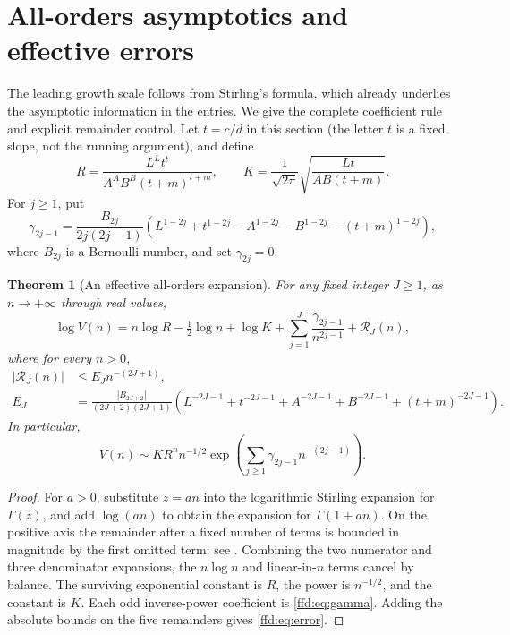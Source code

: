 \documentclass[11pt]{article}
\newtheorem{theorem}{Theorem}[section]
\theoremstyle{definition}
\theoremstyle{remark}
\begin{document}
\section{All-orders asymptotics and effective errors}\label{ffd:sec:asymptotic}
The leading growth scale follows from Stirling's formula, which already
underlies the asymptotic information in the entries. We give the complete
coefficient rule and explicit remainder control. Let $t=c/d$ in this section
(the letter $t$ is a fixed slope, not the running argument), and define
\begin{equation}
 R=\frac{L^L t^t}{A^A B^B(t+m)^{t+m}},\qquad
 K=\frac1{\sqrt{2\pi}}\sqrt{\frac{Lt}{AB(t+m)}}.
 \label{ffd:eq:RK}
\end{equation}
For $j\ge1$, put
\begin{equation}
 \gamma_{2j-1}=
 \frac{B_{2j}}{2j(2j-1)}
 \left(L^{1-2j}+t^{1-2j}-A^{1-2j}-B^{1-2j}-(t+m)^{1-2j}\right),
 \label{ffd:eq:gamma}
\end{equation}
where $B_{2j}$ is a Bernoulli number, and set $\gamma_{2j}=0$.

\begin{theorem}[An effective all-orders expansion]\label{ffd:thm:asymptotic}
For any fixed integer $J\ge1$, as $n\to+\infty$ through real values,
\begin{equation}
 \log V(n)=n\log R-\tfrac12\log n+\log K
 +\sum_{j=1}^J\frac{\gamma_{2j-1}}{n^{2j-1}}
 +\mathcal R_J(n),
 \label{ffd:eq:logasympt}
\end{equation}
where for every $n>0$,
\begin{align}
 |\mathcal R_J(n)|&\le E_J n^{-(2J+1)},\label{ffd:eq:error}\\
 E_J&=\frac{|B_{2J+2}|}{(2J+2)(2J+1)}
 \left(L^{-2J-1}+t^{-2J-1}+A^{-2J-1}
       +B^{-2J-1}+(t+m)^{-2J-1}\right).\nonumber
\end{align}
In particular,
\begin{equation}
 V(n)\sim KR^n n^{-1/2}
 \exp\left(\sum_{j\ge1}\gamma_{2j-1}n^{-(2j-1)}\right).
 \label{ffd:eq:asymptexp}
\end{equation}
\end{theorem}
\begin{proof}
For $a>0$, substitute $z=an$ into the logarithmic Stirling expansion for
$\Gamma(z)$, and add $\log(an)$ to obtain the expansion for $\Gamma(1+an)$.
On the positive axis the remainder after a fixed number of terms is bounded
in magnitude by the first omitted term; see \cite[Section 5.11]{dlmf}.
Combining the two numerator and three denominator expansions, the
$n\log n$ and linear-in-$n$ terms cancel by balance. The surviving exponential
constant is $R$, the power is $n^{-1/2}$, and the constant is $K$.
Each odd inverse-power coefficient is \eqref{ffd:eq:gamma}. Adding the absolute
bounds on the five remainders gives \eqref{ffd:eq:error}.
\end{proof}
\end{document}
